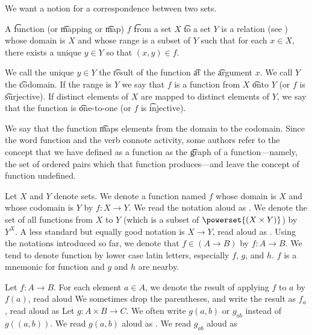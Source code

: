 

We want a notion for a correspondence between two sets.


A \t{function} (or \t{mapping} or \t{map}) $f$ \t{from} a set $X$ \t{to} a set $Y$ is a relation (see ) whose domain is $X$ and whose range is a subset of $Y$ such that for each $x \in X$, there exists a unique $y \in Y$ so that $(x, y) \in f$.

We call the unique $y \in Y$ the \t{result} of the function \t{at} the \t{argument} $x$.
We call $Y$ the \t{codomain}.
If the range is $Y$ we say that $f$ is a function from $X$ \t{onto} $Y$ (or $f$ is \t{surjective}).
If distinct elements of $X$ are mapped to distinct elements of $Y$, we say that the function is \t{one-to-one} (or $f$ is \t{injective}).

We say that the function \t{maps} elements from the domain to the codomain.
Since the word function and the verb  connote activity, some authors refer to the concept that we have defined as a function as the \t{graph} of a function---namely, the set of ordered pairs which that function produces---and leave the concept of function undefined.


Let $X$ and $Y$ denote sets.
We denote a function named $f$ whose domain is $X$ and whose codomain is $Y$ by $f: X \to Y$.
We read the notation aloud as .
We denote the set of all functions from $X$ to $Y$ (which is a subset of $\powerset{(X \times Y)}$) by $Y^{X}$.
A less standard but equally good notation is $X \to Y$, read aloud as .
Using the notations introduced so far, we denote that $f \in (A \to B)$ by $f: A \to B$.
We tend to denote function by lower case latin letters, especially $f$, $g$, and $h$.
$f$ is a mnemonic for function and $g$ and $h$ are nearby.

Let $f: A \to B$.
For each element $a \in A$, we denote the result of applying $f$ to $a$ by $f(a)$, read aloud 
We sometimes drop the parentheses, and write the result as $f_a$, read aloud as 
Let $g: A \times B \to C$.
We often write $g(a,b)$ or $g_{ab}$ instead of $g((a,b))$.
We read $g(a, b)$ aloud as .
We read $g_{ab}$ aloud as 

